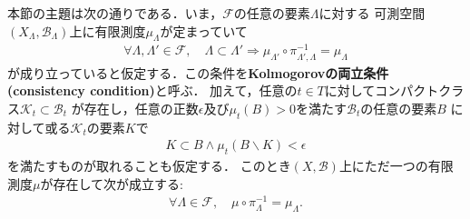 	本節の主題は次の通りである．いま，$\mathscr{F}$の任意の要素$\Lambda$に対する
	可測空間$(X_\Lambda,\mathscr{B}_\Lambda)$上に有限測度$\mu_\Lambda$が定まっていて
	\begin{align}
		\forall \Lambda,\Lambda' \in \mathscr{F},\quad
		\Lambda \subset \Lambda' \Longrightarrow
		\mu_{\Lambda'} \circ \pi_{\Lambda',\Lambda}^{-1}
		= \mu_\Lambda
	\end{align}
	が成り立っていると仮定する．この条件を{\bf Kolmogorovの両立条件}
	{\bf (consistency condition)}と呼ぶ．
	加えて，任意の$t \in T$に対してコンパクトクラス$\mathcal{K}_t \subset \mathscr{B}_t$
	が存在し，任意の正数$\epsilon$及び$\mu_t(B) > 0$を満たす$\mathscr{B}_t$の任意の要素$B$
	に対して或る$\mathcal{K}_t$の要素$K$で
	\begin{align}
		K \subset B \wedge \mu_t(B \backslash K) < \epsilon
	\end{align}
	を満たすものが取れることも仮定する．
	このとき$(X,\mathscr{B})$上にただ一つの有限測度$\mu$が存在して次が成立する:
	\begin{align}
		\forall \Lambda \in \mathscr{F},\quad 
		\mu \circ \pi_{\Lambda}^{-1} = \mu_\Lambda.
	\end{align}
	

